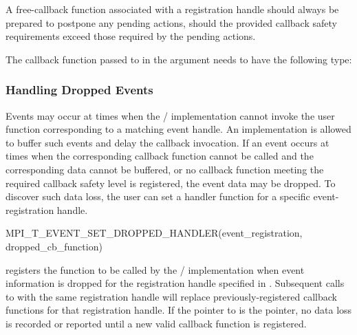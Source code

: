 \begin{users}
    A free-callback function associated with a registration handle should
    always be prepared to postpone any pending actions, should the provided
    callback safety requirements exceed those required by the pending
    actions.
\end{users}


The callback function passed to  in
the argument  needs to have the following
type:


\subsubsection{Handling Dropped Events}
\label{sec:tools:mpit:droppedevents}

Events may occur at times when the \MPI/ implementation cannot invoke
the user function corresponding to a matching event handle.
An implementation is allowed to buffer such events and delay
the callback invocation. If an event occurs at times when
the corresponding callback function cannot be called and the
corresponding data cannot be buffered,
or no callback function meeting the required callback safety level is registered,
the event data may be
dropped. 
To discover such data loss, the user can set a handler
function for a specific event-registration handle.

\begin{funcdef}{MPI\_T\_EVENT\_SET\_DROPPED\_HANDLER}{(\mbox{event\_registration}, \mbox{dropped\_cb\_function})}
\end{funcdef}

 registers the function 
 to be called by the \MPI/
implementation when event information is dropped for the registration handle
specified in . 
Subsequent calls to  
with the same registration handle will replace previously-registered callback functions 
for that registration handle.
If the pointer to
 is the  pointer,
no data loss is recorded or reported until a new valid callback function is registered.


